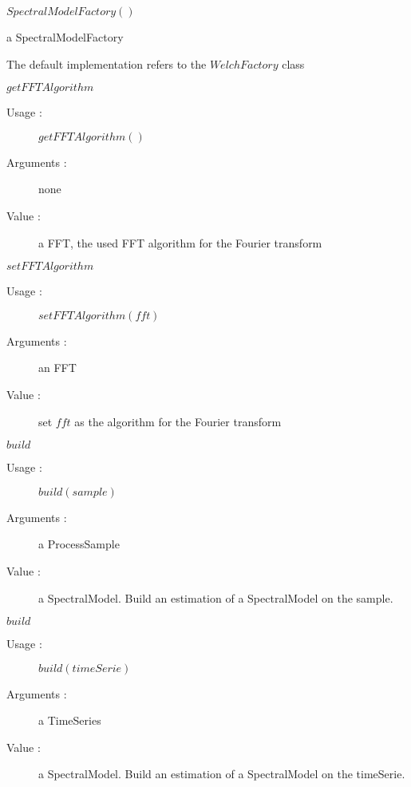 \begin{description}

\item[Usage :] \rule{0pt}{1em}
  \begin{description}
  \item $SpectralModelFactory()$
  \end{description}
  \bigskip

\item[Value :] a SpectralModelFactory
  \rule{0pt}{1em}
  \begin{description}
  \item The default implementation refers to the $WelchFactory$ class
  \end{description}
  \bigskip

\item[Some methods :]  \rule{0pt}{1em}

  \begin{description}

    \item $getFFTAlgorithm$
    \begin{description}
    \item[Usage :] $getFFTAlgorithm()$
    \item[Arguments :] none
    \item[Value :]   a FFT, the used FFT algorithm for the Fourier transform
    \end{description}
    \bigskip

    \item $setFFTAlgorithm$
    \begin{description}
    \item[Usage :] $setFFTAlgorithm(fft)$
    \item[Arguments :] an FFT 
    \item[Value :]   set $fft$ as the algorithm for the Fourier transform
    \end{description}
    \bigskip

    \item $build$
    \begin{description}
    \item[Usage :] $build(sample)$
    \item[Arguments :] a ProcessSample
    \item[Value :]   a SpectralModel. Build an estimation of a SpectralModel on the sample.
    \end{description}
    \bigskip

    \item $build$
    \begin{description}
    \item[Usage :] $build(timeSerie)$
    \item[Arguments :] a TimeSeries
    \item[Value :]  a SpectralModel. Build an estimation of a SpectralModel on the timeSerie.
    \end{description}
    \bigskip


  \end{description}


\end{description}

